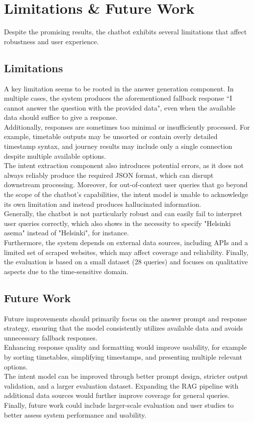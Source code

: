\documentclass[fleqn,moreauthors,10pt]{ds_report}
\begin{document}
\section*{Limitations \& Future Work}
Despite the promising results, the chatbot exhibits several limitations that affect robustness and user experience.
\subsection*{Limitations}
A key limitation seems to be rooted in the answer generation component. In multiple cases, the system produces the aforementioned fallback response “I cannot answer the question with the provided data", even when the available data should suffice to give a response.  \\
Additionally, responses are sometimes too minimal or insufficiently processed. For example, timetable outputs may be unsorted or contain overly detailed timestamp syntax, and journey results may include only a single connection despite multiple available options. \\ 
The intent extraction component also introduces potential errors, as it does not always reliably produce the required JSON format, which can disrupt downstream processing. Moreover, for out-of-context user queries that go beyond the scope of the chatbot's capabilities, the intent model is unable to acknowledge its own limitation and instead produces hallucinated information. \\
Generally, the chatbot is not particularly robust and can easily fail to interpret user queries correctly, which also shows in the necessity to specify "Helsinki asema" instead of "Helsinki", for instance. \\
Furthermore, the system depends on external data sources, including APIs and a limited set of scraped websites, which may affect coverage and reliability. Finally, the evaluation is based on a small dataset (28 queries) and focuses on qualitative aspects due to the time-sensitive domain.

\subsection*{Future Work}
Future improvements should primarily focus on the answer prompt and response strategy, ensuring that the model consistently utilizes available data and avoids unnecessary fallback responses. \\
Enhancing response quality and formatting would improve usability, for example by sorting timetables, simplifying timestamps, and presenting multiple relevant options. \\
The intent model can be improved through better prompt design, stricter output validation, and a larger evaluation dataset. Expanding the RAG pipeline with additional data sources would further improve coverage for general queries. \\
Finally, future work could include larger-scale evaluation and user studies to better assess system performance and usability.
\end{document}
